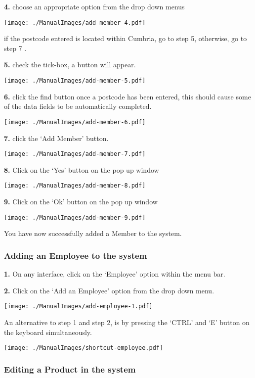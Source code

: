 \textbf{4.} choose an appropriate option from the drop down menus

\texttt{[image: ./ManualImages/add-member-4.pdf]}

if the postcode entered is located within Cumbria, go to step 5, otherwise, go to step 7 .

\textbf{5.} check the tick-box, a button will appear.

\texttt{[image: ./ManualImages/add-member-5.pdf]}

\textbf{6.} click the find button once a postcode has been entered, this should cause some of the data fields to be automatically completed.

\texttt{[image: ./ManualImages/add-member-6.pdf]}

\textbf{7.} click the `Add Member' button.

\texttt{[image: ./ManualImages/add-member-7.pdf]}

\textbf{8.} Click on the `Yes' button on the pop up window

\texttt{[image: ./ManualImages/add-member-8.pdf]}

\textbf{9.} Click on the `Ok' button on the pop up window

\texttt{[image: ./ManualImages/add-member-9.pdf]}

You have now successfully added a Member to the system.

\pagebreak
\subsubsection{Adding an Employee to the system}
\label{fig:Adding an Employee to the system}

\textbf{1.} On any interface, click on the `Employee' option within the menu bar.

\textbf{2.} Click on the `Add an Employee' option from the drop down menu.

\texttt{[image: ./ManualImages/add-employee-1.pdf]}

An alternative to step 1 and step 2, is by pressing the `CTRL' and `E' button on the keyboard simultaneously.

\texttt{[image: ./ManualImages/shortcut-employee.pdf]}

\pagebreak
\subsubsection{Editing a Product in the system}
\label{fig:Editing a Product in the system}


